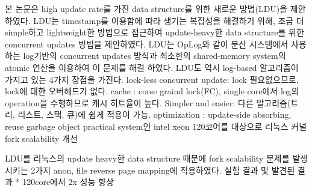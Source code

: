 \else

\fi



%
%
\ifkor
본 논문은 high update rate를 가진 data structure를 위한 새로운 방법(LDU)을 제안하였다.
LDU는 timestamp를 이용함에 따라 생기는 복잡성을 해결하기 위해, 조금 더 simple하고 lightweight한 방법으로 접근하여
update-heavy한 data structure를 위한 concurrent updates 방법을 제안하였다.
LDU는 OpLog와 같이 분산 시스템에서 사용하는 log기반의 concurrent updates 방식과 최소한의 shared-memory
system의 atomic 연산을 이용하여 이 문제를 해결 하였다.
LDU도 역시 log-based 알고리즘이 가지고 있는 4가지 장점을 가진다.  
lock-less concurrent update: lock 필요없으므로, lock에 대한 오버헤드가 없다. 
cache : corse graind lock(FC), single core에서 log의 operation을 수행하므로 캐시 히트율이 높다. 
Simpler and easier: 다른 알고리즘(트리, 리스트, 스택, 큐)에 쉽게 적용이 가능. 
optimization : update-side absorbing, reuse garbage object
practical system인 intel xeon 120코어를 대상으로 리눅스 커널 fork scalability 개선

\else

\fi

%
%

\ifkor
LDU를 리눅스의 update heavy한 data structure 때문에 fork scalability 문제를 발생시키는 2가지 anon,
file reverse page mapping에 적용하였다.
실험 결과 및 발견된 결과 * 120core에서 2x 성능 향상

\else

\fi




%
%

